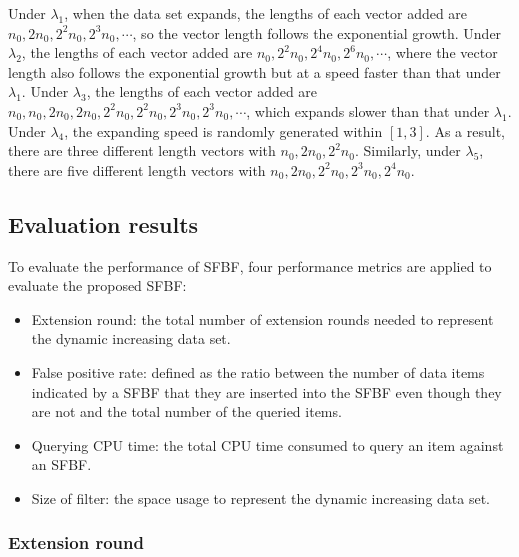 \documentclass[10pt,journal,compsoc]{IEEEtran}
\begin{document}
Under  $\lambda_1$, when the data set expands, the lengths of each vector added are  ${n_0},2{n_0},{2^2}{n_0},{2^3}{n_0}, \cdots$, so the vector length follows the exponential growth. Under  $\lambda_2$, the lengths of each vector added are  ${n_0},{2^2}{n_0},{2^4}{n_0}, {2^6}{n_0},\cdots$, where the vector length also follows the exponential growth but at a speed faster than that under $\lambda_1$. Under  $\lambda_3$, the lengths of each vector added are  ${n_0},{n_0}, 2{n_0},2{n_0},{2^2}{n_0},{2^2}{n_0},{2^3}{n_0}, {2^3}{n_0},\cdots$, which expands slower than that under  $\lambda_1$.  Under $\lambda_4$, the expanding speed is randomly generated within $[1,3]$. As a result, there are three different length vectors with  ${n_0},2{n_0},{2^2}{n_0}$. Similarly, under $\lambda_5$, there are five different length vectors with  ${n_0},2{n_0},{2^2}{n_0},{2^3}{n_0},{2^4}{n_0}$.
\subsection{Evaluation results}

To evaluate the performance of SFBF, four performance metrics are applied to evaluate the proposed SFBF:
\begin{itemize}
  \item  Extension round: the total number of extension rounds needed to represent the dynamic increasing data set.
  \item  False positive rate: defined as the ratio between the number
of data items indicated by a SFBF that they are inserted into the SFBF
even though they are not and the total number of the queried items.
  \item  Querying CPU time: the total CPU time consumed to query an item against an SFBF.
  \item Size of filter: the space usage to represent the dynamic increasing data set.
\end{itemize}

\subsubsection{Extension round}
\end{document}
